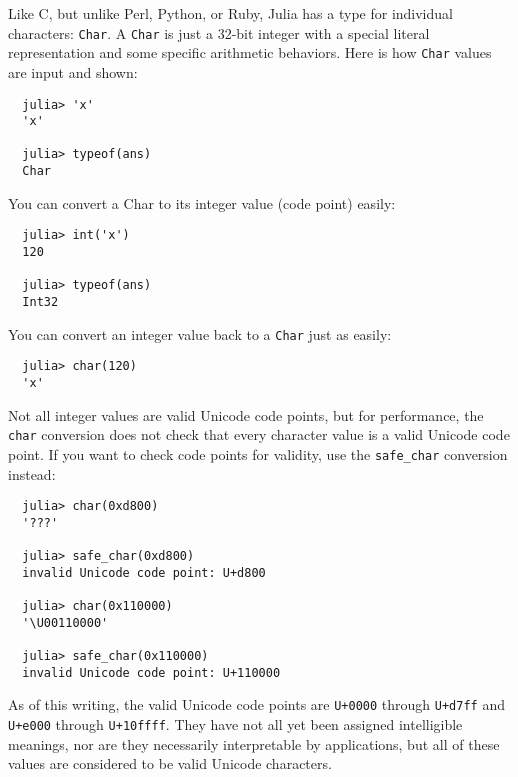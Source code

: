 \documentclass{article}
\begin{document}
Like C, but unlike Perl, Python, or Ruby, Julia has a type for individual characters: \verb|Char|.
A \verb|Char| is just a 32-bit integer with a special literal representation and some specific arithmetic behaviors.
Here is how \verb|Char| values are input and shown:
\begin{verbatim}
  julia> 'x'
  'x'

  julia> typeof(ans)
  Char
\end{verbatim}
You can convert a Char to its integer value (code point) easily:
\begin{verbatim}
  julia> int('x')
  120

  julia> typeof(ans)
  Int32
\end{verbatim}
You can convert an integer value back to a \verb|Char| just as easily:
\begin{verbatim}
  julia> char(120)
  'x'
\end{verbatim}
Not all integer values are valid Unicode code points, but for performance, the \verb|char| conversion does not check that every character value is a valid Unicode code point.
If you want to check code points for validity, use the \verb|safe_char| conversion instead:
\begin{verbatim}
  julia> char(0xd800)
  '???'

  julia> safe_char(0xd800)
  invalid Unicode code point: U+d800

  julia> char(0x110000)
  '\U00110000'

  julia> safe_char(0x110000)
  invalid Unicode code point: U+110000
\end{verbatim}
As of this writing, the valid Unicode code points are \verb|U+0000| through \verb|U+d7ff| and \verb|U+e000| through \verb|U+10ffff|.
They have not all yet been assigned intelligible meanings, nor are they necessarily interpretable by applications, but all of these values are considered to be valid Unicode characters.
\end{document}
